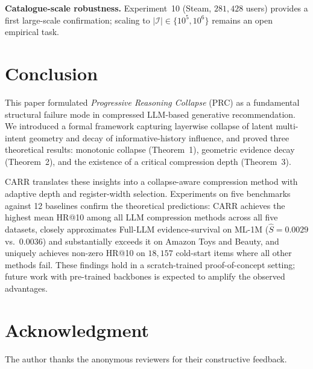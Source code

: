 \documentclass[lettersize,journal]{IEEEtran}
\begin{document}
\textbf{Catalogue-scale robustness.} Experiment~10 (Steam, $281{,}428$ users) provides a first large-scale confirmation; scaling to $|\mathcal{I}| \in \{10^5, 10^6\}$ remains an open empirical task.

\section{Conclusion}
This paper formulated \emph{Progressive Reasoning Collapse} (PRC) as a fundamental structural failure mode in compressed LLM-based generative recommendation. We introduced a formal framework capturing layerwise collapse of latent multi-intent geometry and decay of informative-history influence, and proved three theoretical results: monotonic collapse (Theorem~1), geometric evidence decay (Theorem~2), and the existence of a critical compression depth (Theorem~3).

CARR translates these insights into a collapse-aware compression method with adaptive depth and register-width selection. Experiments on five benchmarks against 12 baselines confirm the theoretical predictions: CARR achieves the highest mean HR@10 among all LLM compression methods across all five datasets, closely approximates Full-LLM evidence-survival on ML-1M ($\widehat{S}=0.0029$ vs.\ $0.0036$) and substantially exceeds it on Amazon Toys and Beauty, and uniquely achieves non-zero HR@10 on $18{,}157$ cold-start items where all other methods fail. These findings hold in a scratch-trained proof-of-concept setting; future work with pre-trained backbones is expected to amplify the observed advantages.

\section*{Acknowledgment}
The author thanks the anonymous reviewers for their constructive feedback.
\end{document}

